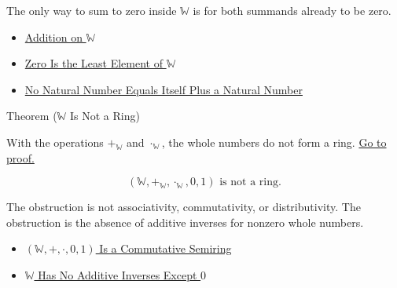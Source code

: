 \begin{remark*}[Interpretation]
The only way to sum to zero inside $\mathbb{W}$ is for both summands already
to be zero.
\end{remark*}

\begin{dependencies}
\begin{itemize}
  \item \hyperref[def:addition-on-w]{Addition on $\mathbb{W}$}
  \item \hyperref[thm:zero-least-element-of-w]{Zero Is the Least Element of $\mathbb{W}$}
  \item \hyperref[thm:no-natural-number-equals-itself-plus-a-natural-number]{No Natural Number Equals Itself Plus a Natural Number}
\end{itemize}
\end{dependencies}

\begin{theorembox}{Theorem (\texorpdfstring{$\mathbb{W}$}{W} Is Not a Ring)}
\begin{theorem}
\label{thm:w-is-not-a-ring}
With the operations $+_{\mathbb{W}}$ and $\cdot_{\mathbb{W}}$, the whole
numbers do not form a ring.
\hyperref[prf:w-is-not-a-ring]{Go to proof.}
\end{theorem}
\end{theorembox}

\begin{remark*}
\[
(\mathbb{W},+_{\mathbb{W}},\cdot_{\mathbb{W}},0,1)
\text{ is not a ring}.
\]
\end{remark*}

\begin{remark*}[Interpretation]
The obstruction is not associativity, commutativity, or distributivity. The
obstruction is the absence of additive inverses for nonzero whole numbers.
\end{remark*}

\begin{dependencies}
\begin{itemize}
  \item \hyperref[thm:w-commutative-semiring]{$(\mathbb{W},+,\cdot,0,1)$ Is a Commutative Semiring}
  \item \hyperref[thm:w-has-no-additive-inverses-except-zero]{$\mathbb{W}$ Has No Additive Inverses Except $0$}
\end{itemize}
\end{dependencies}
